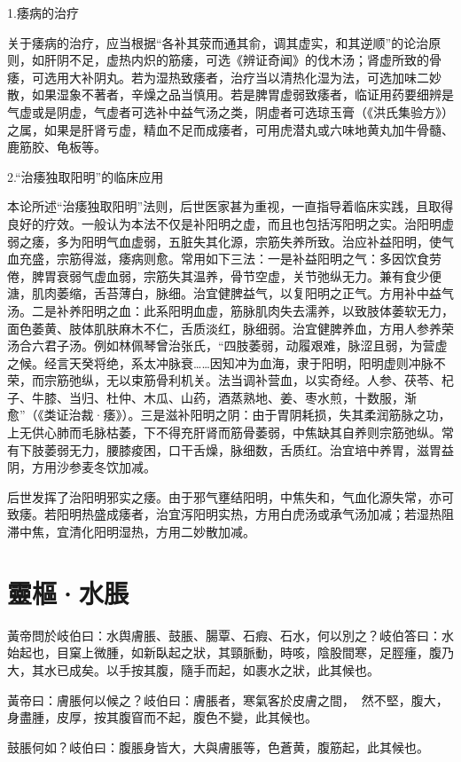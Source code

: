 \documentclass[draft,12pt]{ctexbook}
\begin{document}

1.痿病的治疗

关于痿病的治疗，应当根据“各补其荥而通其俞，调其虚实，和其逆顺”的论治原则，如肝阴不足，虚热内炽的筋痿，可选《辨证奇闻》的伐木汤；肾虚所致的骨痿，可选用大补阴丸。若为湿热致痿者，治疗当以清热化湿为法，可选加味二妙散，如果湿象不著者，辛燥之品当慎用。若是脾胃虚弱致痿者，临证用药要细辨是气虚或是阴虚，气虚者可选补中益气汤之类，阴虚者可选琼玉膏（《洪氏集验方》）之属，如果是肝肾亏虚，精血不足而成痿者，可用虎潜丸或六味地黄丸加牛骨髓、鹿筋胶、龟板等。

2.“治痿独取阳明”的临床应用

本论所述“治痿独取阳明”法则，后世医家甚为重视，一直指导着临床实践，且取得良好的疗效。一般认为本法不仅是补阳明之虚，而且也包括泻阳明之实。治阳明虚弱之痿，多为阳明气血虚弱，五脏失其化源，宗筋失养所致。治应补益阳明，使气血充盛，宗筋得滋，痿病则愈。常用如下三法：一是补益阳明之气：多因饮食劳倦，脾胃衰弱气虚血弱，宗筋失其温养，骨节空虚，关节弛纵无力。兼有食少便溏，肌肉萎缩，舌苔薄白，脉细。治宜健脾益气，以复阳明之正气。方用补中益气汤。二是补养阳明之血：此系阳明血虚，筋脉肌肉失去濡养，以致肢体萎软无力，面色萎黄、肢体肌肤麻木不仁，舌质淡红，脉细弱。治宜健脾养血，方用人参养荣汤合六君子汤。例如林佩琴曾治张氏，“四肢萎弱，动履艰难，脉涩且弱，为营虚之候。经言天癸将绝，系太冲脉衰……因知冲为血海，隶于阳明，阳明虚则冲脉不荣，而宗筋弛纵，无以束筋骨利机关。法当调补营血，以实奇经。人参、茯苓、杞子、牛膝、当归、杜仲、木瓜、山药，酒蒸熟地、姜、枣水煎，十数服，渐愈”（《类证治裁·痿》）。三是滋补阳明之阴：由于胃阴耗损，失其柔润筋脉之功，上无供心肺而毛脉枯萎，下不得充肝肾而筋骨萎弱，中焦缺其自养则宗筋弛纵。常有下肢萎弱无力，腰膝痠困，口干舌燥，脉细数，舌质红。治宜培中养胃，滋胃益阴，方用沙参麦冬饮加减。

后世发挥了治阳明邪实之痿。由于邪气壅结阳明，中焦失和，气血化源失常，亦可致痿。若阳明热盛成痿者，治宜泻阳明实热，方用白虎汤或承气汤加减；若湿热阻滞中焦，宜清化阳明湿热，方用二妙散加减。

\section{靈樞·水脹}%


\begin{yuanwen}
黃帝問於岐伯曰：水舆膚脹、鼓脹、腸覃、石瘕、石水，何以別之？岐伯答曰：水始起也，目窠上微腫，如新臥起之狀，其頸脈動，時咳，陰股間寒，足脛瘇，腹乃大，其水已成矣。以手按其腹，隨手而起，如裹水之狀，此其候也。

黃帝曰：膚脹何以候之？岐伯曰：膚脹者，寒氣客於皮膚之間，𪔣𪔣然不堅，腹大，身盡腫，皮厚，按其腹窅而不起，腹色不變，此其候也。

鼓脹何如？岐伯曰：腹脹身皆大，大與膚脹等，色蒼黄，腹筋起，此其候也。
\end{yuanwen}
\end{document}
